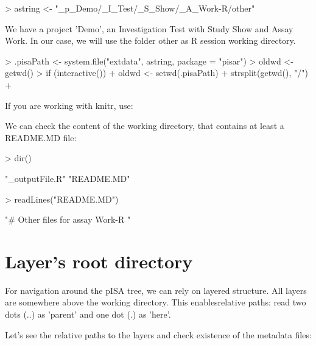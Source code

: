 \documentclass[a4paper,12pt]{article}\usepackage[]{graphicx}\usepackage[]{color}
\makeatletter
\providecommand\code{\bgroup\@codex}
\def\@codex#1{{\normalfont\ttfamily\hyphenchar\font=-1  #1}\egroup}
\providecommand{\file}{\code}
\makeatother
\begin{document}
\begin{Schunk}
\begin{Sinput}
> astring <- "_p_Demo/_I_Test/_S_Show/_A_Work-R/other"
\end{Sinput}
\end{Schunk}

We have a project \code{'Demo'}, an Investigation \code{Test} with Study \code{Show}  and Assay \code{Work}. In our case, we will use the folder \file{other} as R session working directory.

\begin{Schunk}
\begin{Sinput}
> .pisaPath <- system.file("extdata", astring, package = "pisar")
> oldwd <- getwd()
> if (interactive()) {
+     oldwd <- setwd(.pisaPath)
+     strsplit(getwd(), "/")
+ }
\end{Sinput}
\end{Schunk}

If you are working with knitr, use:
\begin{Schunk}
\end{Schunk}

We can check the content of the working directory, that contains at least a \file{README.MD} file:
\begin{Schunk}
\begin{Sinput}
> dir()
\end{Sinput}
\begin{Soutput}
[1] "_outputFile.R" "README.MD"    
\end{Soutput}
\begin{Sinput}
> readLines("README.MD")
\end{Sinput}
\begin{Soutput}
[1] "# Other files for assay Work-R "
\end{Soutput}
\end{Schunk}

\section{Layer's root directory}

For navigation around the pISA tree, we can rely on layered structure. All layers are somewhere above the working directory. This enablesrelative paths: read two dots (..) as 'parent' and one dot (.) as 'here'.

Let's see the relative paths to the layers and check existence of the metadata files:
\end{document}
